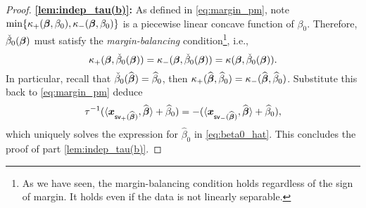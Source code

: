 \begin{proof}
	\vspace{0.5\baselineskip}
	\noindent
	\textbf{\ref{lem:indep_tau(b)}:}
	As defined in \cref{eq:margin_pm}, note $\min\{ 
		\kappa_{+}({\boldsymbol{\beta}}, \beta_0),
		\kappa_{-}({\boldsymbol{\beta}}, \beta_0) \}$ 
	is a piecewise linear concave function of $\beta_0$. Therefore, $\check\beta_0({\boldsymbol{\beta}})$ must satisfy the \emph{margin-balancing} condition\footnote{
		As we have seen, the margin-balancing condition holds regardless of the sign of margin. It holds even if the data is not linearly separable.
	}, i.e., 
	 \begin{equation}\label{eq:margin-bal}
		\kappa_{+}({\boldsymbol{\beta}}, \check\beta_0({\boldsymbol{\beta}})) = \kappa_{-}({\boldsymbol{\beta}}, \check\beta_0({\boldsymbol{\beta}}))
		= \kappa({\boldsymbol{\beta}}, \check\beta_0({\boldsymbol{\beta}})).
	 \end{equation}
	In particular, recall that $\check\beta_0(\widehat{{\boldsymbol{\beta}}}) = \widehat\beta_0$, then $\kappa_{+}(\widehat{{\boldsymbol{\beta}}}, \widehat\beta_0) = \kappa_{-}(\widehat{{\boldsymbol{\beta}}}, \widehat\beta_0)$. Substitute this back to \cref{eq:margin_pm} deduce
	\begin{equation*}
		\tau^{-1}(\langle \text{\boldmath $x$}_{\mathsf{sv}_+(\widehat{{\boldsymbol{\beta}}})}, \widehat{{\boldsymbol{\beta}}} \rangle + \widehat\beta_0)  
			= -(\langle \text{\boldmath $x$}_{\mathsf{sv}_-(\widehat{{\boldsymbol{\beta}}})}, \widehat{{\boldsymbol{\beta}}} \rangle + \widehat\beta_0),
	\end{equation*}
	which uniquely solves the expression for $\hat\beta_0$ in \cref{eq:beta0_hat}. This concludes the proof of part \ref{lem:indep_tau(b)}.


\end{proof}
